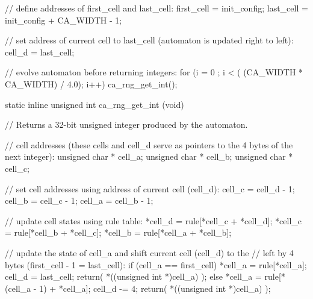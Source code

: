 \documentclass{article}
\begin{document}
\begin{ccode}
{   // define addresses of first_cell and last_cell:
   first_cell = init_config;
   last_cell = init_config + CA_WIDTH - 1;

   // set address of current cell to last_cell (automaton is updated right to left):
   cell_d = last_cell;

   // evolve automaton before returning integers:
   for (i = 0 ; i < ( (CA_WIDTH * CA_WIDTH) / 4.0); i++) 
      ca_rng_get_int();

}

static inline unsigned int ca_rng_get_int (void) {
// Returns a 32-bit unsigned integer produced by the automaton.

   // cell addresses (these cells and cell_d serve as pointers to the 4 bytes of the next integer):
   unsigned char * cell_a;
   unsigned char * cell_b;
   unsigned char * cell_c;

   // set cell addresses using address of current cell (cell_d):
   cell_c = cell_d - 1; 
   cell_b = cell_c - 1; 
   cell_a = cell_b - 1; 

   // update cell states using rule table:
   *cell_d = rule[*cell_c + *cell_d]; 
   *cell_c = rule[*cell_b + *cell_c]; 
   *cell_b = rule[*cell_a + *cell_b]; 

   // update the state of cell_a and shift current cell (cell_d) to the 
   // left by 4 bytes (first_cell - 1 = last_cell):
   if (cell_a == first_cell) { 
      *cell_a = rule[*cell_a]; 
      cell_d = last_cell; 
      return( *((unsigned int *)cell_a) ); 
   } 
   else { 
      *cell_a = rule[*(cell_a - 1) + *cell_a];
      cell_d -= 4; 
      return( *((unsigned int *)cell_a) ); 
   }

}

\end{ccode}
\end{document}
